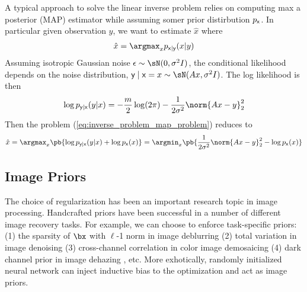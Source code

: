\documentclass[../writeup.tex]{subfiles}
\begin{document}
A typical approach to solve the linear inverse problem relies on computing max a posterior (MAP) estimator while assuming somer prior distirbution $p_{\mathsf{x}}$. In particular given observation $y$, we want to estimate $\hat{x}$ where
\begin{align}
    \hat{x}
        = \argmax_{x} p_{\rx|\ry}(x|y)
    \label{eq:inverse_problem_map_problem}
\end{align}
Assuming isotropic Gaussian noise $\epsilon \sim \sN(0,\sigma^2 I)$, the conditional likelihood depends on the noise distribution, $\ry\mid \rx=x \sim \sN(Ax, \sigma^2 I)$. The log likelihood is then
\begin{align*}
    \log p_{\ry|\rx}(y|x)
        = -\frac{m}{2} \log (2\pi) - \frac{1}{2\sigma^2} \norm{Ax - y}_2^2 
\end{align*}
Then the problem (\ref{eq:inverse_problem_map_problem}) reduces to
\begin{align}
    \hat{x}
        = \argmax_{x} \pb{
            \log p_{\ry|\rx}(y|x) + \log p_{\rx}(x) 
        }
        = \argmin_{x} \pb{
            \frac{1}{2\sigma^2} \norm{Ax-y}_2^2 - \log p_{\rx}(x)
        }
\end{align}







\newpage

\subsection{Image Priors} 






The choice of regularization has been an important research topic in image processing. Handcrafted priors have been successful in a number of different image recovery tasks. For example, we can choose to enforce task-specific priors: (1) the sparsity of $\bx$ with $\ell$-1 norm in image deblurring \cite{beckFastIterativeShrinkageThresholding2009} (2) total variation in image denoising \cite{buadesNonlocalImageMovie2008} (3) cross-channel correlation in color image demosaicing \cite{malvarHighqualityLinearInterpolation2004} (4) dark channel prior in image dehazing \cite{fattalSingleImageDehazing2008}, etc. More exhotically, randomly initialized neural network can inject inductive bias to the optimization and act as image priors. \cite{ulyanovDeepImagePrior2017}
\end{document}
